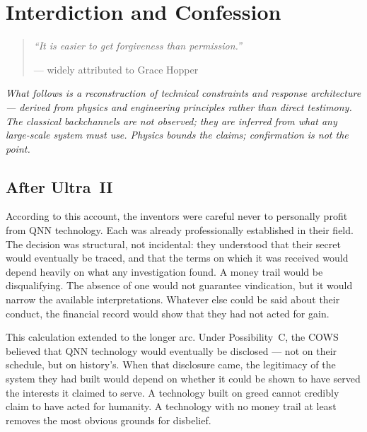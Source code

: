 
\chapter{Interdiction and Confession}
\label{record:interdiction}

\begin{quote}\small\textit{%
``It is easier to get forgiveness than permission.''%
}\par\raggedleft --- widely attributed to Grace Hopper\end{quote}

\vspace{0.5cm}

\textit{What follows is a reconstruction of technical constraints and response architecture --- derived from physics and engineering principles rather than direct testimony. The classical backchannels are not observed; they are inferred from what any large-scale system must use. Physics bounds the claims; confirmation is not the point.}



\section*{After Ultra~II}
\label{record:int-after-ultra-ii}

According to this account, the inventors were careful never to personally profit from QNN technology. Each was already professionally established in their field. The decision was structural, not incidental: they understood that their secret would eventually be traced, and that the terms on which it was received would depend heavily on what any investigation found. A money trail would be disqualifying. The absence of one would not guarantee vindication, but it would narrow the available interpretations. Whatever else could be said about their conduct, the financial record would show that they had not acted for gain.

This calculation extended to the longer arc. Under Possibility~C, the COWS believed that QNN technology would eventually be disclosed --- not on their schedule, but on history's. When that disclosure came, the legitimacy of the system they had built would depend on whether it could be shown to have served the interests it claimed to serve. A technology built on greed cannot credibly claim to have acted for humanity. A technology with no money trail at least removes the most obvious grounds for disbelief.

